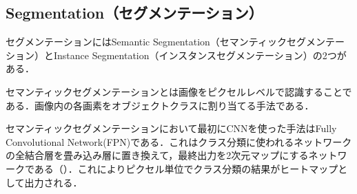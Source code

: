 \subsection{Segmentation（セグメンテーション）}
セグメンテーションにはSemantic Segmentation（セマンティックセグメンテーション）とInstance Segmentation（インスタンスセグメンテーション）の2つがある．

セマンティックセグメンテーションとは画像をピクセルレベルで認識することである．画像内の各画素をオブジェクトクラスに割り当てる手法である．

セマンティックセグメンテーションにおいて最初にCNNを使った手法はFully Convolutional Network(FPN)である\cite{FPN}．これはクラス分類に使われるネットワークの全結合層を畳み込み層に置き換えて，最終出力を2次元マップにするネットワークである（）．これによりピクセル単位でクラス分類の結果がヒートマップとして出力される．
